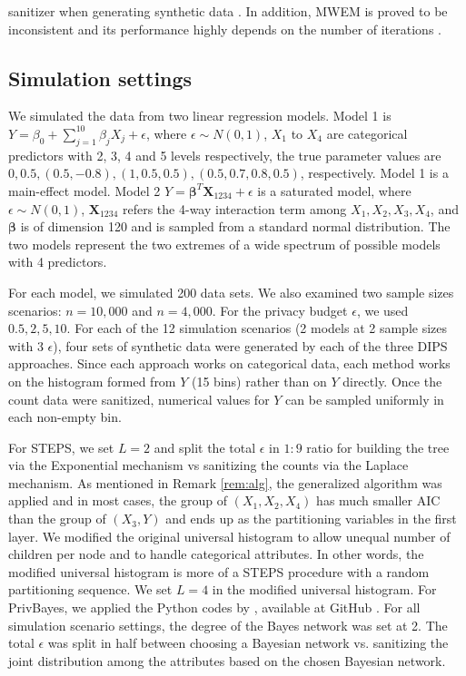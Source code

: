 \documentclass[12pt, A4]{article}
\newcommand{\bs}{\boldsymbol}
\theoremstyle{plain}
\theoremstyle{exampstyle}\newtheorem{defn}{Definition}
\theoremstyle{exampstyle}\newtheorem{lem}{Lemma}
\theoremstyle{exampstyle}\newtheorem{cor}{Corollary}
\theoremstyle{exampstyle}\newtheorem{pro}{Proposition}
\theoremstyle{exampstyle}\newtheorem{cla}{Claim}
\theoremstyle{exampstyle}\newtheorem{rem}{Remark}
\begin{document}
sanitizer when generating synthetic data \citep{cipher}. In addition, MWEM is proved to be inconsistent and its performance highly depends on the number of iterations \citep{hay2016principled, dawa, cipher}.  

\subsection{Simulation settings}
We simulated the data from two linear regression models. Model 1 is $Y=\beta_0+\sum_{j=1}^{10}\beta_jX_j+\epsilon$, where $\epsilon\sim N(0,1)$, $X_1$ to $X_4$ are categorical predictors with 2, 3, 4 and 5 levels respectively, the true parameter values are $0,0.5,(0.5,-0.8),(1,0.5,0.5),(0.5,0.7,0.8,0.5)$, respectively. Model 1 is a main-effect model. Model 2 $Y=\bs\beta^T \mathbf{X}_{1234}+\epsilon$ is a saturated model, where $\epsilon\sim N(0,1)$, $ \mathbf{X}_{1234}$ refers the 4-way interaction term among $X_1, X_2,X_3,X_4$, and $\bs\beta$ is of dimension 120 and is sampled from a standard normal distribution. The two models represent the two extremes of a wide spectrum of possible models with 4 predictors.

For each model, we simulated 200 data sets. We also examined two sample sizes scenarios: $n=10,000$ and $n=4,000$. For the privacy budget $\epsilon$, we used $0.5, 2, 5, 10$. For each of the 12 simulation scenarios (2 models at 2 sample sizes with 3 $\epsilon$), four sets of synthetic data were generated  by each of the three DIPS approaches. Since each approach works on categorical data, each method works on the histogram formed from $Y$ (15 bins) rather than on $Y$ directly. Once the count data were sanitized, numerical values for $Y$ can be sampled uniformly in each non-empty bin.

For STEPS, we set $L=2$ and split the total $\epsilon$ in $1:9$ ratio for building the tree via the Exponential mechanism vs sanitizing the counts via the Laplace mechanism. As mentioned in Remark \ref{rem:alg}, the generalized algorithm was applied and in most cases, the group of $(X_1,X_2,X_4)$ has much smaller AIC than the group of $(X_3,Y)$ and ends up as the partitioning variables in the first layer. We modified the original universal histogram to allow unequal number of children per node and to handle categorical attributes. In other words, the modified universal histogram is more of a STEPS procedure with a random partitioning sequence. We set $L=4$ in the modified universal histogram. For PrivBayes, we applied the Python codes by \citet{ DataSynthesizerpaper}, available at GitHub \citep{DataSynthesizercodes}. For all simulation scenario settings, the degree of the Bayes network was set at 2. The total $\epsilon$ was split in half between choosing a Bayesian network vs. sanitizing the joint distribution among the attributes based on the chosen Bayesian network.
\end{document}
